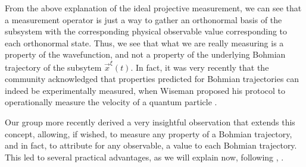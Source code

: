 \documentclass[11pt, a4paper]{article} %
\begin{document}
From the above explanation of the ideal projective measurement, we can see that a measurement operator is just a way to gather an orthonormal basis of the subsystem with the corresponding physical observable value corresponding to each orthonormal state. Thus, we see that what we are really measuring is a property of the wavefunction, and not a property of the underlying Bohmian trajectory of the subsytem $\vec{x}^\xi(t)$. In fact, it was very recently that the community acknowledged that properties predicted for Bohmian trajectories can indeed be experimentally measured, when Wiseman proposed his protocol to operationally measure the velocity of a quantum particle \cite{WisemanVel}.

Our group more recently derived a very insightful observation that extends this concept, allowing, if wished, to measure any property of a Bohmian trajectory, and in fact, to attribute for any observable, a value to each Bohmian trajectory. This led to several practical advantages, as we will explain now, following \cite{DevInPosition1},  \cite{DevInPosition2}.
\end{document}
